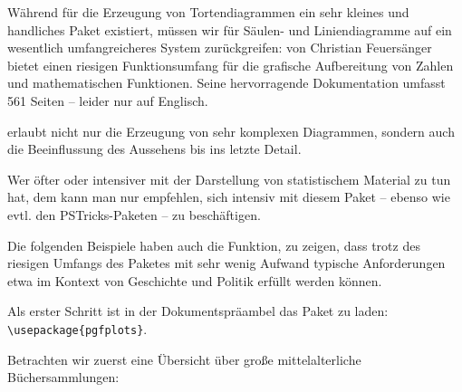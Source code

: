  

Während für die Erzeugung von Tortendiagrammen ein sehr kleines und handliches Paket existiert,
müssen wir für Säulen- und Liniendiagramme auf ein wesentlich umfangreicheres System zurückgreifen:
 von Christian Feuersänger bietet einen riesigen Funktionsumfang für die 
grafische Aufbereitung von Zahlen und mathematischen Funktionen. Seine hervorragende Dokumentation
umfasst  561 Seiten -- leider nur auf Englisch.

 erlaubt nicht nur die Erzeugung von sehr komplexen Diagrammen, sondern auch die
Beeinflussung des Aussehens bis ins letzte Detail.

Wer öfter oder intensiver mit der Darstellung von statistischem Material zu tun hat, dem kann
man nur empfehlen, sich intensiv mit diesem Paket -- ebenso wie evtl. den PSTricks-Paketen --
zu beschäftigen.

Die folgenden Beispiele haben auch die Funktion, zu zeigen, dass trotz des riesigen Umfangs des 
Paketes mit sehr wenig Aufwand typische Anforderungen etwa im Kontext von Geschichte und Politik
erfüllt werden können.

Als erster Schritt ist in der Dokumentspräambel das Paket zu laden:
\lstinline/\usepackage{pgfplots}/.

Betrachten wir zuerst eine Übersicht über große mittelalterliche Büchersammlungen:

\begin{lfgwcode}{}
\end{lfgwcode}

